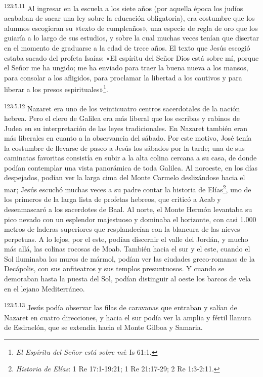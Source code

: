 \par 
\textsuperscript{123:5.11} Al ingresar en la escuela a los siete años (por aquella época los judíos acababan de sacar una ley sobre la educación obligatoria), era costumbre que los alumnos escogieran su «texto de cumpleaños», una especie de regla de oro que los guiaría a lo largo de sus estudios, y sobre la cual muchas veces tenían que disertar en el momento de graduarse a la edad de trece años. El texto que Jesús escogió estaba sacado del profeta Isaías: «El espíritu del Señor Dios está sobre mí, porque el Señor me ha ungido; me ha enviado para traer la buena nueva a los mansos, para consolar a los afligidos, para proclamar la libertad a los cautivos y para liberar a los presos espirituales»\footnote{\textit{El Espíritu del Señor está sobre mí}: Is 61:1.}.

\par 
\textsuperscript{123:5.12} Nazaret era uno de los veinticuatro centros sacerdotales de la nación hebrea. Pero el clero de Galilea era más liberal que los escribas y rabinos de Judea en su interpretación de las leyes tradicionales. En Nazaret también eran más liberales en cuanto a la observancia del sábado. Por este motivo, José tenía la costumbre de llevarse de paseo a Jesús los sábados por la tarde; una de sus caminatas favoritas consistía en subir a la alta colina cercana a su casa, de donde podían contemplar una vista panorámica de toda Galilea. Al noroeste, en los días despejados, podían ver la larga cima del Monte Carmelo deslizándose hacia el mar; Jesús escuchó muchas veces a su padre contar la historia de Elías\footnote{\textit{Historia de Elías}: 1 Re 17:1-19:21; 1 Re 21:17-29; 2 Re 1:3-2:11.}, uno de los primeros de la larga lista de profetas hebreos, que criticó a Acab y desenmascaró a los sacerdotes de Baal. Al norte, el Monte Hermón levantaba su pico nevado con un esplendor majestuoso y dominaba el horizonte, con casi 1.000 metros de laderas superiores que resplandecían con la blancura de las nieves perpetuas. A lo lejos, por el este, podían discernir el valle del Jordán, y mucho más allá, las colinas rocosas de Moab. También hacia el sur y el este, cuando el Sol iluminaba los muros de mármol, podían ver las ciudades greco-romanas de la Decápolis, con sus anfiteatros y sus templos presuntuosos. Y cuando se demoraban hasta la puesta del Sol, podían distinguir al oeste los barcos de vela en el lejano Mediterráneo.

\par 
\textsuperscript{123:5.13} Jesús podía observar las filas de caravanas que entraban y salían de Nazaret en cuatro direcciones, y hacia el sur podía ver la amplia y fértil llanura de Esdraelón, que se extendía hacia el Monte Gilboa y Samaria.

